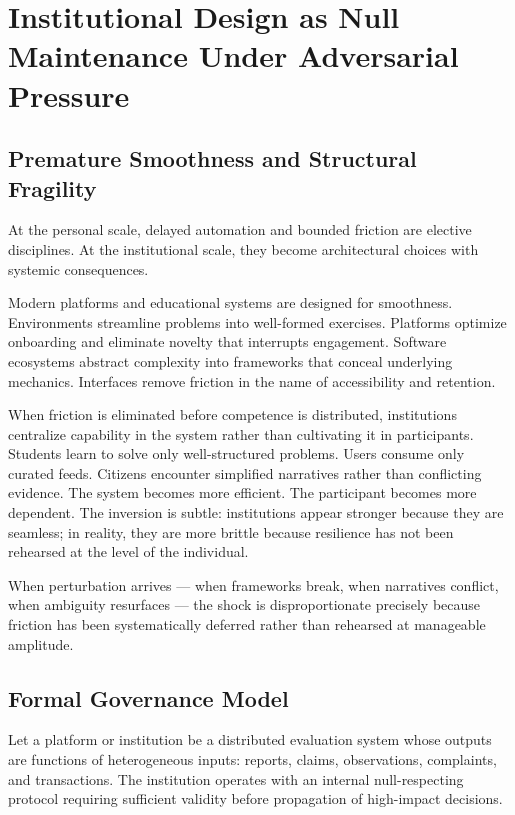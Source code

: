 \documentclass[11pt]{article}
\theoremstyle{remark}
\begin{document}
\section{Institutional Design as Null Maintenance Under Adversarial Pressure}
\label{sec:institutional}

\subsection{Premature Smoothness and Structural Fragility}

At the personal scale, delayed automation and bounded friction are elective disciplines. At the institutional scale, they become architectural choices with systemic consequences.

Modern platforms and educational systems are designed for smoothness. Environments streamline problems into well-formed exercises. Platforms optimize onboarding and eliminate novelty that interrupts engagement. Software ecosystems abstract complexity into frameworks that conceal underlying mechanics. Interfaces remove friction in the name of accessibility and retention.

When friction is eliminated before competence is distributed, institutions centralize capability in the system rather than cultivating it in participants. Students learn to solve only well-structured problems. Users consume only curated feeds. Citizens encounter simplified narratives rather than conflicting evidence. The system becomes more efficient. The participant becomes more dependent. The inversion is subtle: institutions appear stronger because they are seamless; in reality, they are more brittle because resilience has not been rehearsed at the level of the individual.

When perturbation arrives --- when frameworks break, when narratives conflict, when ambiguity resurfaces --- the shock is disproportionate precisely because friction has been systematically deferred rather than rehearsed at manageable amplitude.

\subsection{Formal Governance Model}

Let a platform or institution be a distributed evaluation system whose outputs are functions of heterogeneous inputs: reports, claims, observations, complaints, and transactions. The institution operates with an internal null-respecting protocol requiring sufficient validity before propagation of high-impact decisions.
\end{document}
